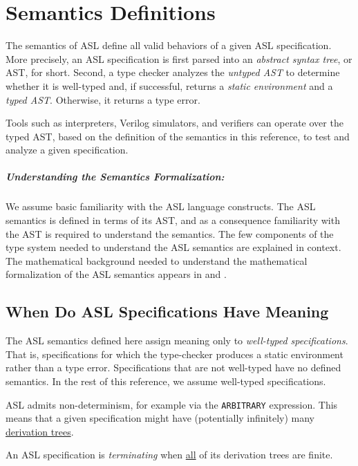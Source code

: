 \chapter{Semantics Definitions\label{chap:Semantics}}

The semantics of ASL define all valid behaviors of a given ASL specification.
More precisely, an ASL specification is first parsed into an \emph{abstract syntax tree},
or AST, for short. Second, a type checker analyzes the \emph{untyped AST} to determine whether it
is well-typed and, if successful, returns a \emph{static environment} and a \emph{typed AST}.
Otherwise, it returns a type error.

Tools such as interpreters, Verilog simulators, and verifiers can operate over the typed AST, based on the definition
of the semantics in this reference, to test and analyze a given specification.

\paragraph{Understanding the Semantics Formalization:}
We assume basic familiarity with the ASL language constructs.
The ASL semantics is defined in terms of its AST,
and as a consequence familiarity with the AST is required to understand the semantics.
The few components of the type system needed to understand the ASL semantics are explained in context.
The mathematical background needed to understand the mathematical formalization
of the ASL semantics appears in  and .

\section{When Do ASL Specifications Have Meaning\label{sec:MeaningfulASLSpecifications}}
The ASL semantics defined here assign meaning only to \emph{well-typed specifications}.
That is, specifications for which the type-checker produces a static environment rather than
a type error.
Specifications that are not well-typed have no defined semantics.
In the rest of this reference, we assume well-typed specifications.

ASL admits non-determinism, for example via the \texttt{ARBITRARY} expression.
This means that a given specification might have (potentially infinitely) many
\hyperlink{def-derivationtree}{derivation trees}.

An ASL specification is \emph{terminating} when \underline{all} of its derivation trees are finite.

